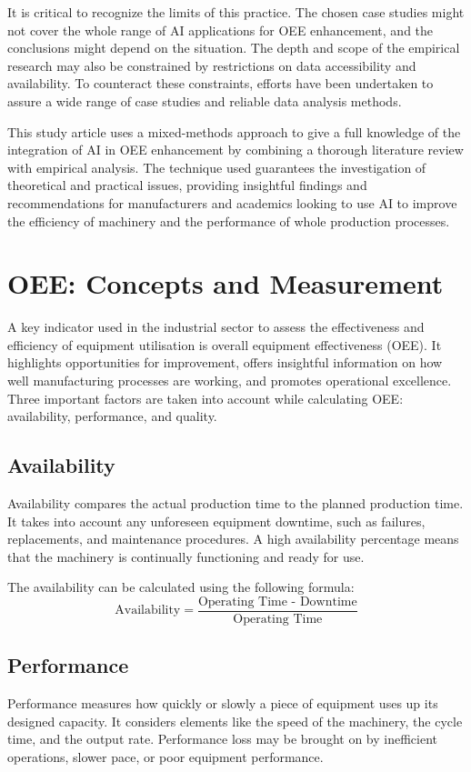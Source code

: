 \documentclass[12pt]{article}
\begin{document}
It is critical to recognize the limits of this practice. The chosen case studies might not cover the whole range of AI applications for OEE enhancement, and the conclusions might depend on the situation. The depth and scope of the empirical research may also be constrained by restrictions on data accessibility and availability. To counteract these constraints, efforts have been undertaken to assure a wide range of case studies and reliable data analysis methods.


This study article uses a mixed-methods approach to give a full knowledge of the integration of AI in OEE enhancement by combining a thorough literature review with empirical analysis. The technique used guarantees the investigation of theoretical and practical issues, providing insightful findings and recommendations for manufacturers and academics looking to use AI to improve the efficiency of machinery and the performance of whole production processes.


\section{OEE: Concepts and Measurement}
A key indicator used in the industrial sector to assess the effectiveness and efficiency of equipment utilisation is overall equipment effectiveness (OEE). It highlights opportunities for improvement, offers insightful information on how well manufacturing processes are working, and promotes operational excellence. Three important factors are taken into account while calculating OEE: availability, performance, and quality.


\subsection{Availability}
Availability compares the actual production time to the planned production time. It takes into account any unforeseen equipment downtime, such as failures, replacements, and maintenance procedures. A high availability percentage means that the machinery is continually functioning and ready for use.

The availability can be calculated using the following formula:
\vspace{0.3cm}
\[
\text{Availability} = \frac{\text{Operating Time - Downtime}}{\text{Operating Time}}
\]

\subsection{Performance}
Performance measures how quickly or slowly a piece of equipment uses up its designed capacity. It considers elements like the speed of the machinery, the cycle time, and the output rate. Performance loss may be brought on by inefficient operations, slower pace, or poor equipment performance.
\end{document}
